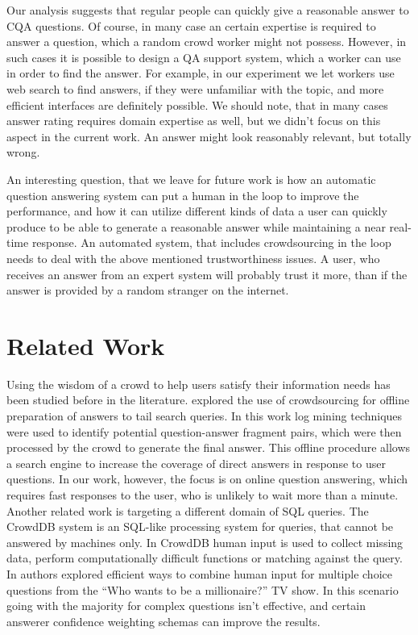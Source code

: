 \documentclass[11pt,letterpaper]{article}
\begin{document}
Our analysis suggests that regular people can quickly give a reasonable answer to CQA questions.
Of course, in many case an certain expertise is required to answer a question, which a random crowd worker might not possess.
However, in such cases it is possible to design a QA support system, which a worker can use in order to find the answer.
For example, in our experiment we let workers use web search to find answers, if they were unfamiliar with the topic, and more efficient interfaces are definitely possible.
We should note, that in many cases answer rating requires domain expertise as well, but we didn't focus on this aspect in the current work.
An answer might look reasonably relevant, but totally wrong.

An interesting question, that we leave for future work is how an automatic question answering system can put a human in the loop to improve the performance, and how it can utilize different kinds of data a user can quickly produce to be able to generate a reasonable answer while maintaining a near real-time response.
An automated system, that includes crowdsourcing in the loop needs to deal with the above mentioned trustworthiness issues.
A user, who receives an answer from an expert system will probably trust it more, than if the answer is provided by a random stranger on the internet.


\section{Related Work}
\label{sec:related_work}

Using the wisdom of a crowd to help users satisfy their information needs has been studied before in the literature.
\cite{bernstein2012direct} explored the use of crowdsourcing for offline preparation of answers to tail search queries.
In this work log mining techniques were used to identify potential question-answer fragment pairs, which were then processed by the crowd to generate the final answer.
This offline procedure allows a search engine to increase the coverage of direct answers in response to user questions.
In our work, however, the focus is on online question answering, which requires fast responses to the user, who is unlikely to wait more than a minute.
Another related work is targeting a different domain of SQL queries.
The CrowdDB system \cite{franklin2011crowddb} is an SQL-like processing system for queries, that cannot be answered by machines only.
In CrowdDB human input is used to collect missing data, perform computationally difficult functions or matching against the query.
In \cite{aydin2014crowdsourcing} authors explored efficient ways to combine human input for multiple choice questions from the ``Who wants to be a millionaire?'' TV show.
In this scenario going with the majority for complex questions isn't effective, and certain answerer confidence weighting schemas can improve the results.  
\end{document}
